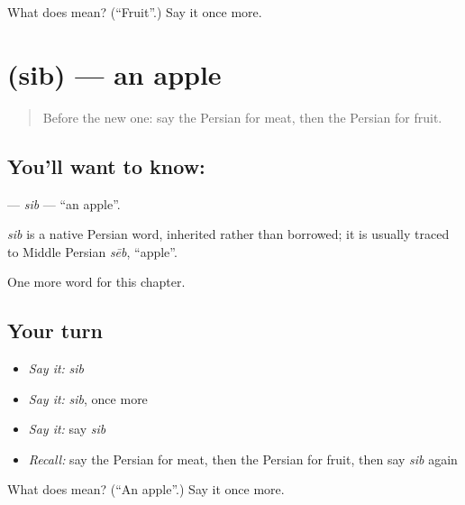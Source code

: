 \begin{tcolorbox}[breakable,colback=teal!4,colframe=teal!35!black,title={Before you move on}]
What does  mean? (\textquotedblleft{}Fruit\textquotedblright{}.) Say it once more.
\end{tcolorbox}
\section[\texorpdfstring{\fa{سیب} (sib)}{سیب (sib)}]{ (sib) — an apple}

\label{lesson:FA-C41-sib}



\begin{quote}
Before the new one: say the Persian for meat, then the Persian for fruit.
\end{quote}

\subsection*{You'll want to know: }
\textbf{} — \emph{sib} — \textquotedblleft{}an apple\textquotedblright{}.

\begin{cousinweb}
\emph{sib} is a native Persian word, inherited rather than borrowed; it is usually traced to Middle Persian \emph{sēb}, \textquotedblleft{}apple\textquotedblright{}.
\end{cousinweb}

\begin{grammarlens}[title={What you've built}]
One more word for this chapter.
\end{grammarlens}

\subsection*{Your turn}
\begin{itemize}
\raggedright
  \item \emph{Say it:} \emph{sib}
  \item \emph{Say it:} \emph{sib}, once more
  \item \emph{Say it:} say \emph{sib}
  \item \emph{Recall:} say the Persian for meat, then the Persian for fruit, then say \emph{sib} again
\end{itemize}

\begin{tcolorbox}[breakable,colback=teal!4,colframe=teal!35!black,title={Before you move on}]
What does  mean? (\textquotedblleft{}An apple\textquotedblright{}.) Say it once more.
\end{tcolorbox}
